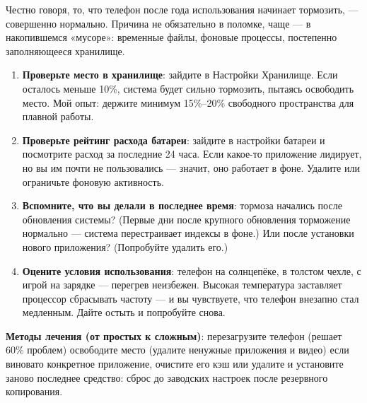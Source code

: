 


Честно говоря, то, что телефон после года использования начинает тормозить, — совершенно нормально. Причина не обязательно в поломке, чаще — в накопившемся «мусоре»: временные файлы, фоновые процессы, постепенно заполняющееся хранилище.


\begin{enumerate}
  \item \textbf{Проверьте место в хранилище}: зайдите в Настройки Хранилище. Если осталось меньше 10\%, система будет сильно тормозить, пытаясь освободить место. Мой опыт: держите минимум 15\%–20\% свободного пространства для плавной работы.
  \item \textbf{Проверьте рейтинг расхода батареи}: зайдите в настройки батареи и посмотрите расход за последние 24 часа. Если какое-то приложение лидирует, но вы им почти не пользовались — значит, оно работает в фоне. Удалите или ограничьте фоновую активность.
  \item \textbf{Вспомните, что вы делали в последнее время}: тормоза начались после обновления системы? (Первые дни после крупного обновления торможение нормально — система перестраивает индексы в фоне.) Или после установки нового приложения? (Попробуйте удалить его.)
  \item \textbf{Оцените условия использования}: телефон на солнцепёке, в толстом чехле, с игрой на зарядке — перегрев неизбежен. Высокая температура заставляет процессор сбрасывать частоту — и вы чувствуете, что телефон внезапно стал медленным. Дайте остыть и попробуйте снова.
\end{enumerate}

\textbf{Методы лечения (от простых к сложным)}: перезагрузите телефон (решает 60\% проблем) освободите место (удалите ненужные приложения и видео) если виновато конкретное приложение, очистите его кэш или удалите и установите заново последнее средство: сброс до заводских настроек после резервного копирования.

